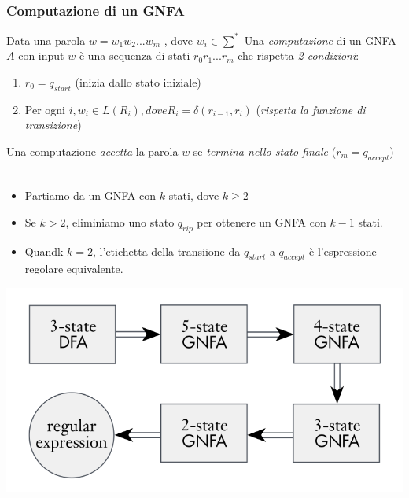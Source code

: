 \subsubsection{Computazione di un GNFA}
Data una parola $w= w_1 w_2 ... w_m$ , dove $w_i \in \sum^*$
Una \textit{computazione} di un GNFA $A$ con input $w$ è una sequenza di stati $r_0r_1...r_m$ che rispetta \textit{2 condizioni}:
\begin{enumerate}
	\item $r_0 = q_{start}$ (inizia dallo stato iniziale)
	\item Per ogni $i, w_i \in L(R_i), dove R_i = \delta(r_{i-1}, r_i)$ (\textit{rispetta la funzione di transizione})
\end{enumerate}
Una computazione \textit{accetta} la parola $w$ se \textit{termina nello stato finale} ($r_m = q_{accept}$)\\\\
\mezzapagina
\begin{itemize}
	\item Partiamo da un GNFA con $k$ stati, dove $k\geq 2$ 
	\item Se $k>2$, eliminiamo uno stato $q_{rip}$ per ottenere un GNFA con $k-1$ stati.
	\item Quandk $k=2$, l'etichetta della transiione da $q_{start}$ a $q_{accept}$ è l'espressione regolare equivalente.
\end{itemize}
\spazio
\includegraphics[scale=0.5]{img/GNFA_1.png}
\finemezzapagina

